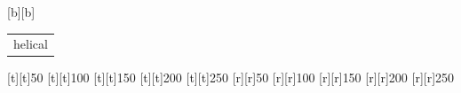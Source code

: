 %    
%
%
\begin{psfrags}%
\psfragscanon%
%
[b][b]{\color[rgb]{0,0,0}\setlength{\tabcolsep}{0pt}\begin{tabular}{c}helical\end{tabular}}%
%
[t][t]{50}%
[t][t]{100}%
[t][t]{150}%
[t][t]{200}%
[t][t]{250}%
%
[r][r]{50}%
[r][r]{100}%
[r][r]{150}%
[r][r]{200}%
[r][r]{250}%
%
%
\end{psfrags}%
%

